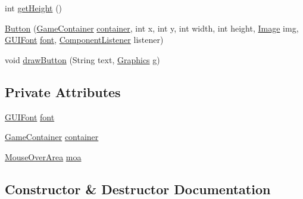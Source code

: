 \begin{DoxyCompactItemize}
\item 
int \mbox{\hyperlink{classgui_1_1_button_aa1ef0f057ac241268c844a9b524309f8}{get\+Height}} ()
\item 
\mbox{\hyperlink{classgui_1_1_button_a9003e70abe9f541a3c2cce5acfcf94aa}{Button}} (\mbox{\hyperlink{classorg_1_1newdawn_1_1slick_1_1_game_container}{Game\+Container}} \mbox{\hyperlink{classgui_1_1_button_a91cd8f6ba1fa010f564dcbc4561ce9a7}{container}}, int x, int y, int width, int height, \mbox{\hyperlink{classorg_1_1newdawn_1_1slick_1_1_image}{Image}} img, \mbox{\hyperlink{classgui_1_1_g_u_i_font}{G\+U\+I\+Font}} \mbox{\hyperlink{classgui_1_1_button_a7f22b2fc3bd45d47a55a2d3ef20e5452}{font}}, \mbox{\hyperlink{interfaceorg_1_1newdawn_1_1slick_1_1gui_1_1_component_listener}{Component\+Listener}} listener)
\item 
void \mbox{\hyperlink{classgui_1_1_button_a0963af10c0ebfda675428cf6692e3df5}{draw\+Button}} (String text, \mbox{\hyperlink{classorg_1_1newdawn_1_1slick_1_1_graphics}{Graphics}} g)
\end{DoxyCompactItemize}
\subsection*{Private Attributes}
\begin{DoxyCompactItemize}
\item 
\mbox{\hyperlink{classgui_1_1_g_u_i_font}{G\+U\+I\+Font}} \mbox{\hyperlink{classgui_1_1_button_a7f22b2fc3bd45d47a55a2d3ef20e5452}{font}}
\item 
\mbox{\hyperlink{classorg_1_1newdawn_1_1slick_1_1_game_container}{Game\+Container}} \mbox{\hyperlink{classgui_1_1_button_a91cd8f6ba1fa010f564dcbc4561ce9a7}{container}}
\item 
\mbox{\hyperlink{classorg_1_1newdawn_1_1slick_1_1gui_1_1_mouse_over_area}{Mouse\+Over\+Area}} \mbox{\hyperlink{classgui_1_1_button_abccfc83b8fee5280bf5022b3b211054e}{moa}}
\end{DoxyCompactItemize}


\subsection{Constructor \& Destructor Documentation}
\mbox{\label{classgui_1_1_button_a9d43604fe7ed9d76404abba348ff731e}} 

